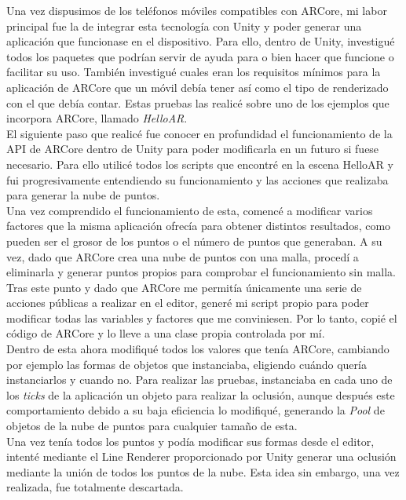 Una vez dispusimos de los teléfonos móviles compatibles con ARCore, mi labor principal fue la de integrar esta tecnología con Unity y poder generar una aplicación que funcionase en el dispositivo. Para ello, dentro de Unity, investigué todos los paquetes que podrían servir de ayuda para o bien hacer que funcione o facilitar su uso. También investigué cuales eran los requisitos mínimos para la aplicación de ARCore que un móvil debía tener así como el tipo de renderizado con el que debía contar. Estas pruebas las realicé sobre uno de los ejemplos que incorpora ARCore, llamado \textit{HelloAR}.\\

El siguiente paso que realicé fue conocer en profundidad el funcionamiento de la API de ARCore dentro de Unity para poder modificarla en un futuro si fuese necesario. Para ello utilicé todos los scripts que encontré en la escena HelloAR y fui progresivamente entendiendo su funcionamiento y las acciones que realizaba para generar la nube de puntos.\\

Una vez comprendido el funcionamiento de esta, comencé a modificar varios factores que la misma aplicación ofrecía para obtener distintos resultados, como pueden ser el grosor de los puntos o el número de puntos que generaban. A su vez, dado que ARCore crea una nube de puntos con una malla, procedí a eliminarla y generar puntos propios para comprobar el funcionamiento sin malla.\\

Tras este punto y dado que ARCore me permitía únicamente una serie de acciones públicas a realizar en el editor, generé mi script propio para poder modificar todas las variables y factores que me conviniesen. Por lo tanto, copié el código de ARCore y lo lleve a una clase propia controlada por mí.\\

Dentro de esta ahora modifiqué todos los valores que tenía ARCore, cambiando por ejemplo las formas de objetos que instanciaba, eligiendo cuándo quería instanciarlos y cuando no. Para realizar las pruebas, instanciaba en cada uno de los \textit{ticks} de la aplicación un objeto para realizar la oclusión, aunque después este comportamiento debido a su baja eficiencia lo modifiqué, generando la \textit{Pool} de objetos de la nube de puntos para cualquier tamaño de esta.\\

Una vez tenía todos los puntos y podía modificar sus formas desde el editor, intenté mediante el Line Renderer proporcionado por Unity generar una oclusión mediante la unión de todos los puntos de la nube. Esta idea sin embargo, una vez realizada, fue totalmente descartada.\\

